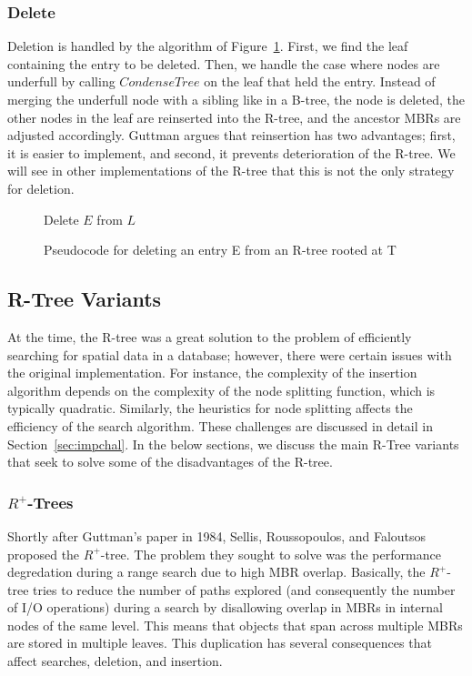 \subsubsection{Delete}
Deletion is handled by the algorithm of Figure~\ref{fig:R_Tree_Delete}. First,
we find the leaf containing the entry to be deleted. Then, we handle the case
where nodes are underfull by calling $CondenseTree$ on the leaf that held
the entry. Instead of merging the underfull node with a sibling like in a 
B-tree, the node is deleted, the other nodes in the leaf are reinserted into 
the R-tree, and the ancestor MBRs are adjusted accordingly. Guttman argues that
reinsertion has two advantages; first, it is easier to implement, and second, 
it prevents deterioration of the R-tree. We will see in other implementations
of the R-tree that this is not the only strategy for deletion.

\begin{figure}[t]
\begin{algorithmic}
	\State {}
	\State Delete $E$ from $L$
	\State {}
\EndFunction
\end{algorithmic}
\caption{Pseudocode for deleting an entry E from an R-tree rooted at T}
\label{fig:R_Tree_Delete}
\end{figure}

\subsection{R-Tree Variants}
\label{sec:variants}
At the time, the R-tree  was a great solution to the problem of efficiently searching
for spatial data in a database; however, there were certain issues with the original
implementation. For instance, the complexity of the insertion algorithm
depends on the complexity of the node splitting function, which is typically
quadratic. Similarly, the heuristics for node splitting affects the efficiency of 
the search algorithm. These challenges are discussed in detail in 
Section~\ref{sec:impchal}. In the below sections, we discuss the main R-Tree
variants that seek to solve some of the disadvantages of the R-tree.

\subsubsection{$R^{+}$-Trees}
Shortly after Guttman's paper in 1984, Sellis, Roussopoulos, and Faloutsos proposed 
the $R^{+}$-tree. The problem they sought to solve was the performance degredation 
during a range search due to high MBR overlap. Basically, the $R^{+}$-tree tries to 
reduce the number of paths explored (and consequently the number of I/O operations) 
during a search by disallowing overlap in MBRs in internal nodes of the same level. 
This means that objects that span across multiple MBRs are stored in multiple leaves. 
This duplication has several consequences that affect searches, deletion, and insertion.

